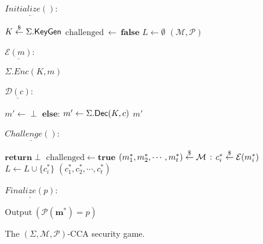 \begin{figure}
\begin{adjustbox}{margin*=10,frame,center}
	\footnotesize
	\begin{minipage}[t]{0.42\textwidth}
		$\underline{Initialize()}$: 
		\begin{algorithmic}[1]		
			\State $K \overset{\$}{\leftarrow} \Sigma.\mathsf{KeyGen}$
			\State $\text{challenged} \ \leftarrow \ \mathbf{false}$			
			\State $L \leftarrow \emptyset$
			\State \Return $(\mathcal{M},\mathcal{P})$
		\end{algorithmic}
		
		\bigskip{}		
	
		$\underline{\mathcal{E}(m)}$:
		\begin{algorithmic}[1]
			\State \Return $\Sigma.Enc(K,m)$
		\end{algorithmic}
		
		\bigskip{}		
		
		$\underline{\mathcal{D}(c)}$:
		\begin{algorithmic}[1]
		\State {}
			\State\hspace{\algorithmicindent} $m' \leftarrow \perp$
		\State $\mathbf{else}$:
			\State\hspace{\algorithmicindent} $m' \leftarrow \Sigma.\mathsf{Dec}(K,c)$
		\State \Return $m'$
		\end{algorithmic}

	\end{minipage}
	
	
	\begin{minipage}[t]{0.51\textwidth}
		$\underline{Challenge()}$:
		\begin{algorithmic}[1]
		\State {}
			\State\hspace{\algorithmicindent} $\mathbf{return} \perp$
		\State $\text{challenged} \leftarrow \mathbf{true}$
		\State $\tiny(m^{*}_{1}, m^{*}_{2}, \cdots, m^{*}_{t}) \overset{\$}{\leftarrow} \mathcal{M}$
		\State {}:
			\State\hspace{\algorithmicindent} $c^{*}_{i} \overset{\$}{\leftarrow} \mathcal{E}(m^{*}_{i})$
			\State\hspace{\algorithmicindent} $L \leftarrow L \cup \{c^{*}_{i}\}$
		\State \Return $(c^{*}_{1}, c^{*}_{2}, \cdots , c^{*}_{t})$
		\end{algorithmic}
		
		\bigskip{}
		
		$\underline{Finalize(p)}$:
		\begin{algorithmic}[1]
			\State $\text{Output} \ (\mathcal{P}(\mathbf{m}^{*}) = p)$
		\end{algorithmic}
	\end{minipage}
\end{adjustbox}
\caption{The $(\Sigma,\mathcal{M},\mathcal{P})$-CCA security game.}
\label{fig:newindcca}
\end{figure}

